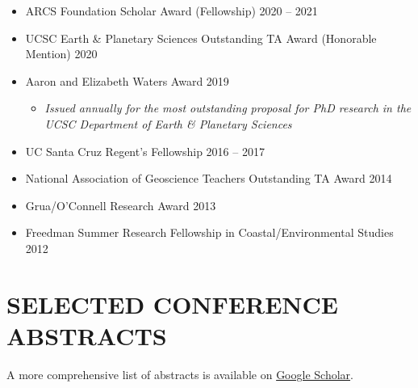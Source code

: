\documentclass[10pt]{article}
\begin{document}
\begin{itemize} [leftmargin=0pt,label={},itemsep=1ex]
	\item ARCS Foundation Scholar Award (Fellowship) \hfill 2020 – 2021
	\item UCSC Earth \& Planetary Sciences Outstanding TA Award (Honorable Mention) \hfill 2020
	\item Aaron and Elizabeth Waters Award  \hfill 2019
	\begin{itemize} [label={}, rightmargin=30ex]
	\item \textit{Issued annually for the most outstanding proposal for PhD research in the UCSC Department of Earth \& Planetary Sciences}
	\end{itemize}
	\item UC Santa Cruz Regent’s Fellowship \hfill 2016 – 2017
	\item National Association of Geoscience Teachers Outstanding TA Award \hfill 2014
	\item Grua/O’Connell Research Award  \hfill 2013
	\item Freedman Summer Research Fellowship in Coastal/Environmental Studies \hfill 2012
\end{itemize}


\section*{SELECTED CONFERENCE ABSTRACTS}

\begin{center} A more comprehensive list of abstracts is available on \href{https://scholar.google.com/citations?user=KHLOvgcAAAAJ&hl=en}{Google Scholar}. \end{center}
\end{document}
